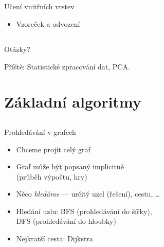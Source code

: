 \documentclass{beamer}
\begin{document}
\subsection{}
\begin{frame}{Učení vnitřních vrstev}
\begin{itemize}
\item Vzoreček a odvození
\end{itemize}
\end{frame}

\subsection{}
\begin{frame}{Otázky?}
\begin{center}
Příště: Statistické zpracování dat, PCA.
\end{center}
\end{frame}

\section{Základní algoritmy}

\subsection{}
\begin{frame}{Prohledávání v grafech}
\begin{itemize}
\item Chceme projít celý graf
\item Graf může být popsaný implicitně \\ (průběh výpočtu, hry)
\item Něco {\em hledáme} --- určitý uzel (řešení), cestu, \dots
\item Hledání uzlu: BFS (prohledávání do šířky), \\ DFS (prohledávání do hloubky)
\item Nejkratší cesta: Dijkstra
\end{itemize}
\end{frame}

\subsection{}
\end{document}
